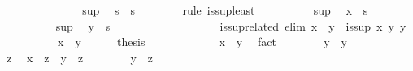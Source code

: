 \begin{isabellebody}
\isanewline
\ \ \ \ \ \ \isamarkupfalse%
\isanewline
\ \ \ \ \ \ \isamarkupfalse%
\ sup{\isacharprime}\ \isamarkupfalse%
\ {\isachardoublequoteopen}s{\isacharprime}\ {\isasymsqsubseteq}\ s{\isachardoublequoteclose}\isanewline
\ \ \ \ \ \ \isamarkupfalse%
\ {\isacharparenleft}rule\ is{\isacharunderscore}sup{\isacharunderscore}least{\isacharparenright}\isanewline
\ \ \ \ \ \ \ \ \isamarkupfalse%
\ sup\ \isamarkupfalse%
\ {\isachardoublequoteopen}x\ {\isasymsqsubseteq}\ s{\isachardoublequoteclose}\ \isacommand{{\isachardot}{\isachardot}}\isamarkupfalse%
\isanewline
\ \ \ \ \ \ \ \ \isamarkupfalse%
\ sup\ \isamarkupfalse%
\ {\isachardoublequoteopen}y\ {\isasymsqsubseteq}\ s{\isachardoublequoteclose}\ \isacommand{{\isachardot}{\isachardot}}\isamarkupfalse%
\isanewline
\ \ \ \ \ \ \isamarkupfalse%
\isanewline
\ \ \ \ \isamarkupfalse%
\isanewline
\ \ \isamarkupfalse%
%
\endisatagproof
{\isafoldproof}%
%
\isadelimproof
\isanewline
%
\endisadelimproof
%
\isadeliminvisible
\isanewline
\ \ %
\endisadeliminvisible
%
\isataginvisible
{}\isamarkupfalse%
\ is{\isacharunderscore}sup{\isacharunderscore}related\ {\isacharbrackleft}elim{\isacharquery}{\isacharbrackright}{\isacharcolon}\ {\isachardoublequoteopen}x\ {\isasymsqsubseteq}\ y\ {\isasymLongrightarrow}\ is{\isacharunderscore}sup\ x\ y\ y{\isachardoublequoteclose}\isanewline
\ \ \isamarkupfalse%
\ {\isacharminus}\isanewline
\ \ \ \ \isamarkupfalse%
\ {\isachardoublequoteopen}x\ {\isasymsqsubseteq}\ y{\isachardoublequoteclose}\isanewline
\ \ \ \ \isamarkupfalse%
\ {\isacharquery}thesis\isanewline
\ \ \ \ \isamarkupfalse%
\isanewline
\ \ \ \ \ \ \isamarkupfalse%
\ {\isachardoublequoteopen}x\ {\isasymsqsubseteq}\ y{\isachardoublequoteclose}\ \isamarkupfalse%
\ fact\isanewline
\ \ \ \ \ \ \isamarkupfalse%
\ {\isachardoublequoteopen}y\ {\isasymsqsubseteq}\ y{\isachardoublequoteclose}\ \isacommand{{\isachardot}{\isachardot}}\isamarkupfalse%
\isanewline
\ \ \ \ \ \ \isamarkupfalse%
\ z\ \isamarkupfalse%
\ {\isachardoublequoteopen}x\ {\isasymsqsubseteq}\ z{\isachardoublequoteclose}\ \ {\isachardoublequoteopen}y\ {\isasymsqsubseteq}\ z{\isachardoublequoteclose}\isanewline
\ \ \ \ \ \ \isamarkupfalse%
\ {\isachardoublequoteopen}y\ {\isasymsqsubseteq}\ z{\isachardoublequoteclose}\ \isamarkupfalse%

\end{isabellebody}
